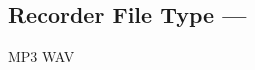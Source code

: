 \subsection[Recorder File Type]{Recorder File Type --- \UiKey{\SET}}









































MP3
WAV
